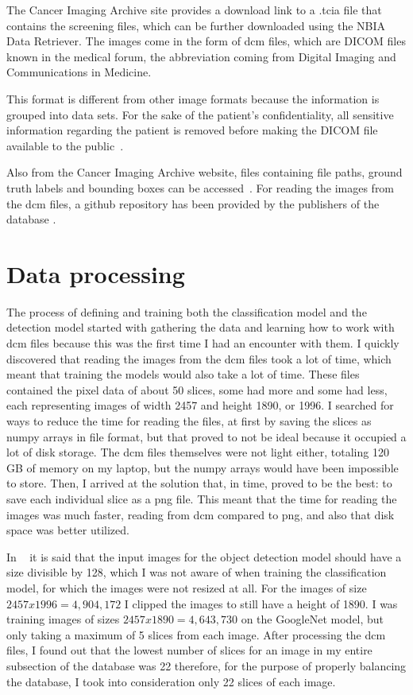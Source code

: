 The Cancer Imaging Archive site provides a download link to a .tcia file that contains the screening files, which can be further downloaded using the NBIA Data Retriever. The images come in the form of dcm files, which are DICOM files known in the medical forum, the abbreviation coming from Digital Imaging and Communications in Medicine.

This format is different from other image formats because the information is grouped into data sets. For the sake of the patient's confidentiality, all sensitive information regarding the patient is removed before making the DICOM file available to the public~\cite{carte6}.

Also from the Cancer Imaging Archive website, files containing file paths, ground truth labels and bounding boxes can be accessed~\cite{carte7}. For reading the images from the dcm files, a github repository has been provided by the publishers of the data\-base \cite{link5}.

\section{Data processing}

The process of defining and training both the classification model and the detection model started with gathering the data and learning how to work with dcm files because this was the first time I had an encounter with them. I quickly discovered that reading the images from the dcm files took a lot of time, which meant that training the models would also take a lot of time. These files contained the pixel data of about 50 slices, some had more and some had less, each representing images of width 2457 and height 1890, or 1996. I searched for ways to reduce the time for reading the files, at first by saving the slices as numpy arrays in file format, but that proved to not be ideal because it occupied a lot of disk storage. The dcm files themselves were not light either, totaling 120 GB of memory on my laptop, but the numpy arrays would have been impossible to store. Then, I arrived at the solution that, in time, proved to be the best: to save each individual slice as a png file. This meant that the time for reading the images was much faster, reading from dcm compared to png, and also that disk space was better utilized.

In ~\cite{carte8} it is said that the input images for the object detection model should have a size divisible by 128, which I was not aware of when training the classification model, for which the images were not resized at all. For the images of size \(2457x1996=4,904,172\) I clipped the images to still have a height of 1890. I was training images of sizes \(2457x1890=4,643,730\) on the GoogleNet model, but only taking a maximum of 5 slices from each image. After processing the dcm files, I found out that the lowest number of slices for an image in my entire subsection of the database was 22 therefore, for the purpose of properly balancing the database, I took into consideration only 22 slices of each image. 
 
